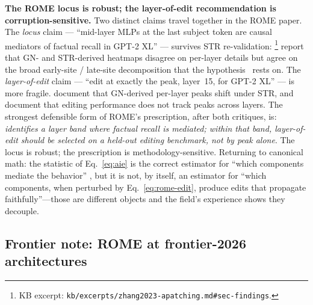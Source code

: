 \begin{contradiction}
\textbf{The ROME locus is robust; the layer-of-edit recommendation is
corruption-sensitive.} Two distinct claims travel together in the
ROME paper. The \emph{locus} claim --- ``mid-layer MLPs at the last
subject token are causal mediators of factual recall in GPT-2 XL''
--- survives STR re-validation: \citet[\S
3]{zhang2023-apatching}\footnote{KB excerpt:
\nolinkurl{kb/excerpts/zhang2023-apatching.md#sec-findings}.} report that
GN- and STR-derived heatmaps disagree on per-layer details but agree
on the broad early-site / late-site decomposition that the
hypothesis~\citep[\S 2.3]{meng2022-rome} rests on. The \emph{layer-of-edit}
claim --- ``edit at exactly the  peak, layer~15, for GPT-2 XL''
--- is more fragile. \citet[\S 1]{zhang2023-apatching} document that
GN-derived per-layer peaks shift under STR, and
document that editing performance does not track  peaks across
layers. The strongest defensible form of ROME's prescription, after
both critiques, is: \emph{ identifies a layer band where
factual recall is mediated; within that band, layer-of-edit should be
selected on a held-out editing benchmark, not by  peak alone}. The
locus is robust; the prescription is methodology-sensitive. Returning
to canonical math: the  statistic of Eq.~\eqref{eq:aie} is the
correct estimator for ``which components mediate the behavior''
\citep[\S 2.1]{zhang2023-apatching}, but it is not, by itself, an
estimator for ``which components, when perturbed by
Eq.~\eqref{eq:rome-edit}, produce edits that propagate
faithfully''---those are different objects and the field's experience
shows they decouple.
\end{contradiction}

\subsection{Frontier note: ROME at frontier-2026 architectures}
\label{sec:rome-frontier}

